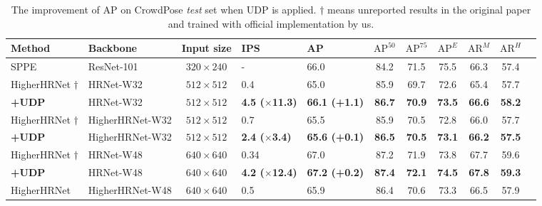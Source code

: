 \documentclass[10pt,journal,compsoc]{IEEEtran}
\begin{document}
\begin{table*}[t]
\caption{The improvement of AP on CrowdPose \textit{test} set when UDP is applied. $\dagger$ means unreported results in the original paper and trained with official implementation by us.}
\label{tab:crowdpose}
\footnotesize
\begin{center}
\begin{tabular}{l|l|c|l|lcccccc}

\hline
Method                            & Backbone      &Input size             &IPS   &AP                     & $\text{AP}^{50}$ & $\text{AP}^{75}$   & $\text{AP}^{E}$   & $\text{AR}^{M}$       &$\text{AR}^{H}$ \\
\hline
SPPE \cite{Crowdpose}             & ResNet-101    &$320\times240$         &-     &66.0                   & 84.2             & 71.5               & 75.5              &66.3                   &57.4\\
HigherHRNet \cite{Higher}$\dagger$&HRNet-W32      &$512\times512$         &0.4   &65.0                   & 85.9             & 69.7               & 72.6              &65.4                   &57.7\\
\textbf{+UDP}                     &HRNet-W32      &$512\times512$         &\textbf{4.5 ($\times$11.3)}   &\textbf{66.1 (+1.1)}          & \textbf{86.7}    & \textbf{70.9}      & \textbf{73.5}     &\textbf{66.6}          &\textbf{58.2}\\
HigherHRNet \cite{Higher}$\dagger$&HigherHRNet-W32&$512\times512$         &0.7   &65.5                   & 85.9             & 70.5               & 72.8              &66.0                   &57.7\\
\textbf{+UDP}                     &HigherHRNet-W32&$512\times512$         &\textbf{2.4 ($\times$3.4)}   &\textbf{65.6 (+0.1)}          & \textbf{86.5}    & \textbf{70.5}      & \textbf{73.1}     &\textbf{66.2}          &\textbf{57.5}\\
HigherHRNet \cite{Higher}$\dagger$&HRNet-W48      &$640\times640$         &0.34   &67.0                   & 87.2             & 71.9               & 73.8              &67.7                   &59.6\\
\textbf{+UDP}                     &HRNet-W48      &$640\times640$         &\textbf{4.2 ($\times$12.4)}   &\textbf{67.2 (+0.2)}   & \textbf{87.4}    & \textbf{72.1}      & \textbf{74.5}     &\textbf{67.8}          &\textbf{59.3}\\
HigherHRNet \cite{Higher}         &HigherHRNet-W48&$640\times640$         &0.5   &65.9                   & 86.4             & 70.6               & 73.3              &66.5                   &57.9\\

\end{tabular}
\end{center}
\end{table*}
\end{document}
